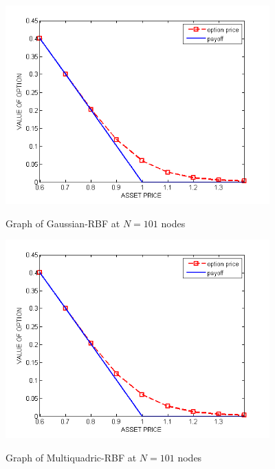 \documentclass[12pt]{article}
\numberwithin{equation}{subsection} %
\begin{document}
\newpage
 \begin{figure}[h]
\begin{center}
\includegraphics*[height=3in]{gau41.png}\
\end{center}
\vspace{-0.5in}
 \caption{Graph of Gaussian-RBF at $N=101$ nodes }
 \begin{center}
\includegraphics*[height=3in]{mq101.png}\
\vspace{-0.5in}
\end{center}
 \caption{Graph of Multiquadric-RBF at $N=101$ nodes}

 \end{figure}
\end{document}
